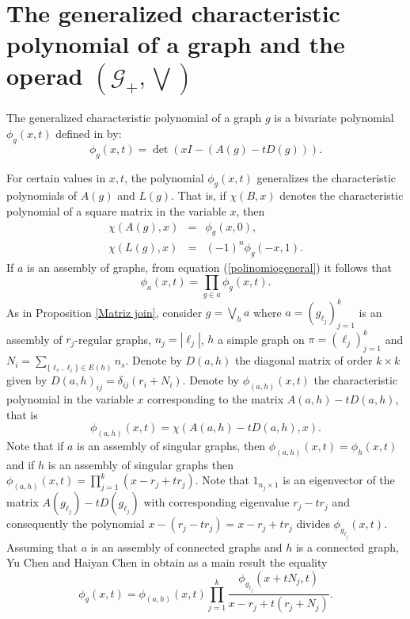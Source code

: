 \documentclass[11pt]{article}
\theoremstyle{definition}
\begin{document}
\section{The generalized characteristic polynomial of a graph and the operad $(\mathscr{G}_+, \bigvee)$}
The generalized characteristic polynomial of a graph $g$ is a bivariate polynomial $\phi_g(x, t)$ defined in \cite{LibroCvetkovic} by:
\begin{equation}\label{polinomiogeneral}
    \phi_g(x,t)=\det(xI-(A(g)-tD(g))).
\end{equation}

For certain values in $x, t$, the polynomial $\phi_g(x,t)$ generalizes the characteristic polynomials of $A(g)$ and $L(g)$. That is, if $\chi(B,x)$ denotes the characteristic polynomial of a square matrix in the variable $x$, then
\begin{eqnarray*}
    \chi(A(g), x)&=&\phi_g(x,0),\\
    \chi(L(g), x)&=&(-1)^n\phi_g(-x,1).
\end{eqnarray*}
If $a$ is an assembly of graphs, from equation (\ref{polinomiogeneral}) it follows that
\[\phi_a(x, t)=\prod_{g\in a}\phi_g(x,t).\]
As in Proposition \ref{Matriz join}, consider $g=\displaystyle{\bigvee_h a}$ where $a=(g_{\ell_j})^k_{j=1}$ is an assembly of $r_j$-regular graphs, $n_j=|\ell_j|$, $h$ a simple graph on $\pi=(\ell_j)^k_{j=1}$ and $\displaystyle{N_i=\sum_{\{\ell_s, \ell_i\}\in E(h)} n_s}$. Denote by $D(a,h)$ the diagonal matrix of order $k\times k$ given by $D(a, h)_{ij}=\delta_{ij}(r_i+N_i)$. Denote by $\phi_{(a,h)}(x,t)$ the characteristic polynomial in the variable $x$ corresponding to the matrix $A(a,h)-tD(a,h)$, that is
\[\phi_{(a,h)}(x,t)=\chi(A(a,h)-tD(a,h), x).\]
Note that if $a$ is an assembly of singular graphs, then $\phi_{(a,h)}(x,t)=\phi_h(x,t)$ and if $h$ is an assembly of singular graphs then $\phi_{(a, h)}(x,t)=\prod^k_{j=1}(x-r_j+tr_j)$.
Note that $1_{n_j\times 1}$ is an eigenvector of the matrix $A(g_{\ell_j})-tD(g_{\ell_j})$ with corresponding eigenvalue $r_j-tr_j$ and consequently the polynomial $x-(r_j-tr_j)=x-r_j+tr_j$ divides $\phi_{g_{\ell_j}}(x,t)$. Assuming that $a$ is an assembly of connected graphs and $h$ is a connected graph, Yu Chen and Haiyan Chen in \cite{YuHaiyanchen2019} obtain as a main result the equality
\begin{equation}\label{Chenfactor}
    \phi_g(x,t)=\phi_{(a,h)}(x,t)\prod^k_{j=1}\dfrac{\phi_{g_{\ell_j}}(x+tN_j,t)}{x-r_j+t(r_j+N_j)}.
\end{equation}
\end{document}
